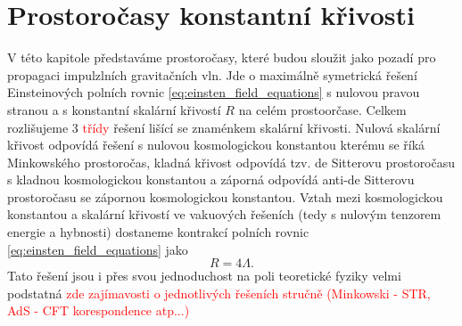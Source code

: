 \chapter{Prostoročasy konstantní křivosti}
V této kapitole představáme prostoročasy, které budou sloužit jako pozadí pro propagaci impulzlních gravitačních vln. Jde o maximálně
symetrická řešení Einsteinových polních rovnic \eqref{eq:einsten_field_equations} s nulovou pravou stranou a s konstantní skalární křivostí $R$ na celém prostoorčase.
Celkem rozlišujeme 3 \textcolor{red}{třídy} řešení lišící se znaménkem skalární křivosti. Nulová skalární křivost odpovídá řešení s nulovou
kosmologickou konstantou kterému se říká Minkowského prostoročas, kladná křivost odpovídá tzv. de Sitterovu prostoročasu s kladnou kosmologickou
konstantou a záporná odpovídá anti-de Sitterovu prostoročasu se zápornou kosmologickou konstantou. Vztah mezi kosmologickou konstantou a skalární
křivostí ve vakuových řešeních (tedy s nulovým tenzorem energie a hybnosti) dostaneme kontrakcí polních rovnic \eqref{eq:einsten_field_equations} jako
\begin{equation}
     R = 4 \Lambda.
\end{equation}
Tato řešení jsou i přes svou jednoduchost na poli teoretické fyziky velmi podstatná \cite{Bicak:2000ea} \textcolor{red}{zde zajímavosti
o jednotlivých řešeních stručně (Minkowski - STR, AdS - CFT korespondence atp...)}
